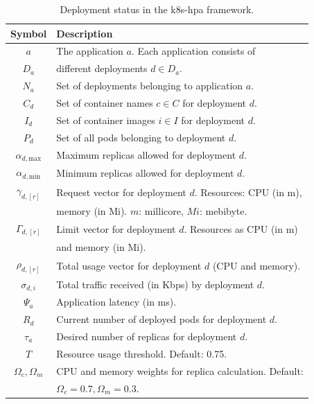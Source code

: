 \documentclass[conference]{IEEEtran}
\begin{document}
\begin{table}[h]
    \centering
    \caption{Deployment status in the k8s-hpa framework.}
    \label{tab:k8s-deployment}
    \begin{tabular}{|c|l|}
        \hline
        \textbf{Symbol} & \textbf{Description} \\
        \hline
        $a$ & The application $a$. Each application consists of \\
        $D_a$ & different deployments $d \in D_a$. \\
        $N_a$ & Set of deployments belonging to application $a$. \\
        $C_d$ & Set of container names $c \in C$ for deployment $d$. \\
        $I_d$ & Set of container images $i \in I$ for deployment $d$. \\
        $P_d$ & Set of all pods belonging to deployment $d$. \\
        $\alpha_{d, \text{max}}$ & Maximum replicas allowed for deployment $d$. \\
        $\alpha_{d, \text{min}}$ & Minimum replicas allowed for deployment $d$. \\
        $\gamma_{d,[r]}$ & Request vector for deployment $d$. Resources: CPU (in m), \\
        & memory (in Mi). $m$: millicore, $Mi$: mebibyte. \\
        $\Gamma_{d,[r]}$ & Limit vector for deployment $d$. Resources as CPU (in m) \\
        & and memory (in Mi). \\
        $\rho_{d,[r]}$ & Total usage vector for deployment $d$ (CPU and memory). \\
        $\sigma_{d,i}$ & Total traffic received (in Kbps) by deployment $d$. \\
        $\Psi_a$ & Application latency (in ms). \\
        $R_d$ & Current number of deployed pods for deployment $d$. \\
        $\tau_a$ & Desired number of replicas for deployment $d$. \\
        $T$ & Resource usage threshold. Default: 0.75. \\
        $\Omega_c, \Omega_m$ & CPU and memory weights for replica calculation. Default: \\
        & $\Omega_c = 0.7, \Omega_m = 0.3$. \\
        \hline
    \end{tabular}
\end{table}
\end{document}

